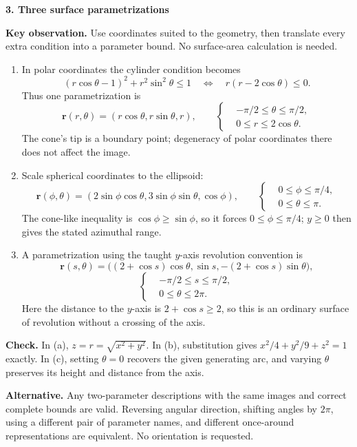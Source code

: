 \documentclass[11pt,letterpaper]{article}
\renewcommand{\vec}[1]{\mathbf{#1}}
\newcommand{\solutionproblem}[3]{%
  \par\bigskip\Needspace{7\baselineskip}
  \noindent\textbf{#1. #2}\par\nobreak
}
\newcommand{\insight}[1]{\par\textbf{Key observation.} #1\par}
\newcommand{\verification}[1]{\par\textbf{Check.} #1\par}
\newcommand{\alternative}[1]{\par\textbf{Alternative.} #1\par}
\begin{document}
\solutionproblem{3}{Three surface parametrizations}{12}
\insight{Use coordinates suited to the geometry, then translate every
extra condition into a parameter bound. No surface-area calculation is
needed.}
\begin{enumerate}[label=(\alph*)]
\item In polar coordinates the cylinder condition becomes
\[
(r\cos\theta-1)^2+r^2\sin^2\theta\le1
\quad\Longleftrightarrow\quad r(r-2\cos\theta)\le0.
\]
Thus one parametrization is
\[
\boxed{\vec r(r,\theta)=(r\cos\theta,r\sin\theta,r)},\qquad
\left\{\begin{aligned}
&-\pi/2\le\theta\le\pi/2,\\
&0\le r\le2\cos\theta.
\end{aligned}\right.
\]
The cone's tip is a boundary point; degeneracy of polar coordinates
there does not affect the image.

\item Scale spherical coordinates to the ellipsoid:
\[
\boxed{\vec r(\phi,\theta)
=(2\sin\phi\cos\theta,3\sin\phi\sin\theta,\cos\phi)},\qquad
\left\{\begin{aligned}
&0\le\phi\le\pi/4,\\
&0\le\theta\le\pi.
\end{aligned}\right.
\]
The cone-like inequality is $\cos\phi\ge\sin\phi$, so it forces
$0\le\phi\le\pi/4$; $y\ge0$ then gives the stated azimuthal range.

\item A parametrization using the taught $y$-axis revolution convention is
\[
\boxed{\vec r(s,\theta)
=\bigl((2+\cos s)\cos\theta,\sin s,-(2+\cos s)\sin\theta\bigr)},
\]
\[
\left\{\begin{aligned}
&-\pi/2\le s\le\pi/2,\\
&0\le\theta\le2\pi.
\end{aligned}\right.
\]
Here the distance to the $y$-axis is $2+\cos s\ge2$, so this is an
ordinary surface of revolution without a crossing of the axis.
\end{enumerate}
\verification{In (a), $z=r=\sqrt{x^2+y^2}$. In (b), substitution gives
$x^2/4+y^2/9+z^2=1$ exactly. In (c), setting $\theta=0$ recovers the
given generating arc, and varying $\theta$ preserves its height and
distance from the axis.}
\alternative{Any two-parameter descriptions with the same images and
correct complete bounds are valid. Reversing angular direction, shifting
angles by $2\pi$, using a different pair of parameter names, and different
once-around representations are equivalent. No orientation is requested.}
\end{document}
